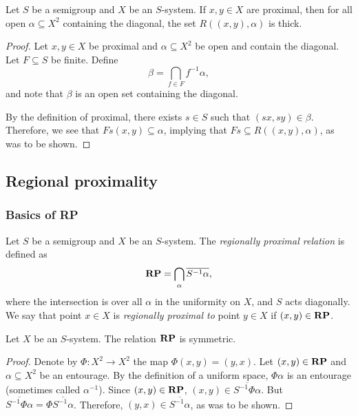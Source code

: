 \begin{theorem}
\label{thm_prox_pair_visits_diag_thickly}
\leanok{}
    Let $S$ be a semigroup and $X$ be an $S$-system.  If $x, y \in X$ are proximal, then for all open $\alpha \subseteq X^2$ containing the diagonal, the set $R((x,y), \alpha)$ is thick.
\end{theorem}

\begin{proof}
\leanok{}
    Let $x, y \in X$ be proximal and $\alpha \subseteq X^2$ be open and contain the diagonal.  Let $F \subseteq S$ be finite. Define
    \[\beta = \bigcap_{f \in F} f^{-1} \alpha,\]
    and note that $\beta$ is an open set containing the diagonal.

    By the definition of proximal, there exists $s \in S$ such that $(sx,sy) \in \beta$.  Therefore, we see that $Fs (x,y) \subseteq \alpha$, implying that $Fs \subseteq R((x,y),\alpha)$, as was to be shown.
\end{proof}

\subsection{Regional proximality}

\subsubsection{Basics of RP}

\begin{definition}
\label{def_rp_relation}
\leanok{}
    Let $S$ be a semigroup and $X$ be an $S$-system.  The \emph{regionally proximal relation} is defined as
    \[\mathbf{RP} = \bigcap_{\alpha} \overline{S^{-1} \alpha},\]
    where the intersection is over all $\alpha$ in the uniformity on $X$, and $S$ acts diagonally.  We say that point $x \in X$ is \emph{regionally proximal to} point $y \in X$ if $(x,y) \in \mathbf{RP}$.
\end{definition}

\begin{lemma}
    \label{lemma_frp_basics_symmetric}
    \leanok{}
    Let $X$ be an $S$-system.  The relation $\mathbf{RP}$ is symmetric.
\end{lemma}

\begin{proof}
\leanok{}
    Denote by $\Phi: X^2 \to X^2$ the map $\Phi(x,y) = (y,x)$. Let $(x,y) \in \mathbf{RP}$ and $\alpha \subseteq X^2$ be an entourage. By the definition of a uniform space, $\Phi \alpha$ is an entourage (sometimes called $\alpha^{-1}$). Since $(x,y) \in \mathbf{RP}$, $(x,y) \in \overline{S^{-1} \Phi \alpha}$. But $\overline{S^{-1} \Phi \alpha} = \Phi \overline{S^{-1} \alpha}$. Therefore, $(y,x) \in \overline{S^{-1} \alpha}$, as was to be shown.
\end{proof}


